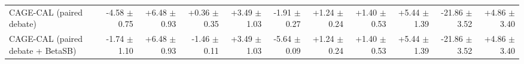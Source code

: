 \begin{tabular}{lrrrrrrrrrr}
CAGE-CAL (paired debate) & -4.58 {\scriptsize $\pm$ 0.75} & +6.48 {\scriptsize $\pm$ 0.93} & +0.36 {\scriptsize $\pm$ 0.35} & +3.49 {\scriptsize $\pm$ 1.03} & -1.91 {\scriptsize $\pm$ 0.27} & +1.24 {\scriptsize $\pm$ 0.24} & +1.40 {\scriptsize $\pm$ 0.53} & +5.44 {\scriptsize $\pm$ 1.39} & -21.86 {\scriptsize $\pm$ 3.52} & +4.86 {\scriptsize $\pm$ 3.40} \\
CAGE-CAL (paired debate + BetaSB) & -1.74 {\scriptsize $\pm$ 1.10} & +6.48 {\scriptsize $\pm$ 0.93} & -1.46 {\scriptsize $\pm$ 0.11} & +3.49 {\scriptsize $\pm$ 1.03} & -5.64 {\scriptsize $\pm$ 0.09} & +1.24 {\scriptsize $\pm$ 0.24} & +1.40 {\scriptsize $\pm$ 0.53} & +5.44 {\scriptsize $\pm$ 1.39} & -21.86 {\scriptsize $\pm$ 3.52} & +4.86 {\scriptsize $\pm$ 3.40} \\
\bottomrule
\end{tabular}
